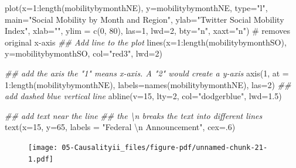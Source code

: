 \documentclass[
  letterpaper,
  DIV=11,
  numbers=noendperiod]{scrreprt}
\newenvironment{Shaded}{\begin{snugshade}}{\end{snugshade}}
\newcommand{\AttributeTok}[1]{\textcolor[rgb]{0.40,0.45,0.13}{#1}}
\newcommand{\CommentTok}[1]{\textcolor[rgb]{0.37,0.37,0.37}{#1}}
\newcommand{\DecValTok}[1]{\textcolor[rgb]{0.68,0.00,0.00}{#1}}
\newcommand{\DocumentationTok}[1]{\textcolor[rgb]{0.37,0.37,0.37}{\textit{#1}}}
\newcommand{\FloatTok}[1]{\textcolor[rgb]{0.68,0.00,0.00}{#1}}
\newcommand{\FunctionTok}[1]{\textcolor[rgb]{0.28,0.35,0.67}{#1}}
\newcommand{\NormalTok}[1]{\textcolor[rgb]{0.00,0.23,0.31}{#1}}
\newcommand{\SpecialCharTok}[1]{\textcolor[rgb]{0.37,0.37,0.37}{#1}}
\newcommand{\StringTok}[1]{\textcolor[rgb]{0.13,0.47,0.30}{#1}}
\begin{document}
\begin{Shaded}
\begin{Highlighting}[]
\FunctionTok{plot}\NormalTok{(}\AttributeTok{x=}\DecValTok{1}\SpecialCharTok{:}\FunctionTok{length}\NormalTok{(mobilitybymonthNE),}
     \AttributeTok{y=}\NormalTok{mobilitybymonthNE,}
     \AttributeTok{type=}\StringTok{"l"}\NormalTok{, }
     \AttributeTok{main=}\StringTok{"Social Mobility by Month and Region"}\NormalTok{,}
     \AttributeTok{ylab=}\StringTok{"Twitter Social Mobility Index"}\NormalTok{,}
     \AttributeTok{xlab=}\StringTok{""}\NormalTok{,}
     \AttributeTok{ylim =} \FunctionTok{c}\NormalTok{(}\DecValTok{0}\NormalTok{, }\DecValTok{80}\NormalTok{),}
     \AttributeTok{las=}\DecValTok{1}\NormalTok{, }
     \AttributeTok{lwd=}\DecValTok{2}\NormalTok{, }
     \AttributeTok{bty=}\StringTok{"n"}\NormalTok{,}
     \AttributeTok{xaxt=}\StringTok{"n"}\NormalTok{) }\CommentTok{\# removes original x{-}axis}
\DocumentationTok{\#\# Add line to the plot }
\FunctionTok{lines}\NormalTok{(}\AttributeTok{x=}\DecValTok{1}\SpecialCharTok{:}\FunctionTok{length}\NormalTok{(mobilitybymonthSO),}
     \AttributeTok{y=}\NormalTok{mobilitybymonthSO, }\AttributeTok{col=}\StringTok{"red3"}\NormalTok{, }\AttributeTok{lwd=}\DecValTok{2}\NormalTok{)}

\DocumentationTok{\#\# add the axis the "1" means x{-}axis. A "2" would create a y{-}axis}
\FunctionTok{axis}\NormalTok{(}\DecValTok{1}\NormalTok{, }\AttributeTok{at =} \DecValTok{1}\SpecialCharTok{:}\FunctionTok{length}\NormalTok{(mobilitybymonthNE), }
     \AttributeTok{labels=}\FunctionTok{names}\NormalTok{(mobilitybymonthNE), }\AttributeTok{las=}\DecValTok{2}\NormalTok{)}
\DocumentationTok{\#\# add dashed blue vertical line}
\FunctionTok{abline}\NormalTok{(}\AttributeTok{v=}\DecValTok{15}\NormalTok{, }\AttributeTok{lty=}\DecValTok{2}\NormalTok{, }\AttributeTok{col=}\StringTok{"dodgerblue"}\NormalTok{, }\AttributeTok{lwd=}\FloatTok{1.5}\NormalTok{)}

\DocumentationTok{\#\# add text near the line}
\DocumentationTok{\#\# the \textbackslash{}n breaks the text into different lines}
\FunctionTok{text}\NormalTok{(}\AttributeTok{x=}\DecValTok{15}\NormalTok{, }\AttributeTok{y=}\DecValTok{65}\NormalTok{, }\AttributeTok{labels =} \StringTok{"Federal }\SpecialCharTok{\textbackslash{}n}\StringTok{ Announcement"}\NormalTok{, }\AttributeTok{cex=}\NormalTok{.}\DecValTok{6}\NormalTok{)}
\end{Highlighting}
\end{Shaded}

\begin{figure}[H]

{\centering \texttt{[image: 05-Causalityii\_files/figure-pdf/unnamed-chunk-21-1.pdf]}

}

\end{figure}
\end{document}
